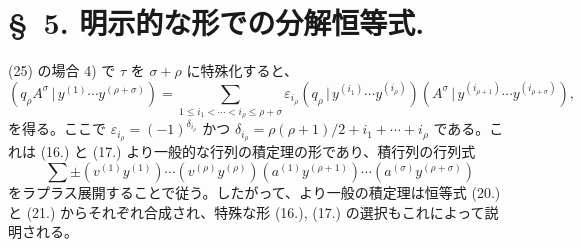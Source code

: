 \documentclass[11pt]{jlreq}
\newcommand{\pair}[2]{(#1\,|\,#2)}
\newcommand{\eps}{\varepsilon}
\begin{document}
\section*{\S\ 5. 明示的な形での分解恒等式.}
(25) の場合 4) で $\tau$ を $\sigma+\rho$ に特殊化すると、
\begin{equation}
 \pair{q_\rho A^\sigma}{y^{(1)}\cdots y^{(\rho+\sigma)}}
 =\sum_{1\le i_1<\cdots<i_\rho\le \rho+\sigma}
 \eps_{i_\rho}\pair{q_\rho}{y^{(i_1)}\cdots y^{(i_\rho)}}
 \pair{A^\sigma}{y^{(i_{\rho+1})}\cdots y^{(i_{\rho+\sigma})}},
\tag{32}
\end{equation}
を得る。ここで $\eps_{i_\rho}=(-1)^{\delta_{i_\rho}}$ かつ $\delta_{i_\rho}=\rho(\rho+1)/2+i_1+\cdots+i_\rho$ である。これは (16.) と (17.) より一般的な行列の積定理の形であり、積行列の行列式
\[
 \sum\pm(v^{(1)}y^{(1)})\cdots(v^{(\rho)}y^{(\rho)})(a^{(1)}y^{(\rho+1)})\cdots(a^{(\sigma)}y^{(\rho+\sigma)})
\]
をラプラス展開することで従う。したがって、より一般の積定理は恒等式 (20.) と (21.) からそれぞれ合成され、特殊な形 (16.), (17.) の選択もこれによって説明される。
\end{document}
